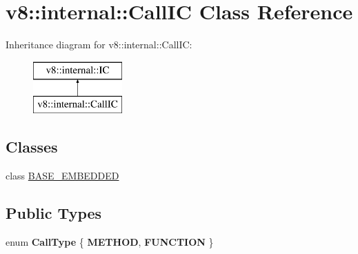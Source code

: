\hypertarget{classv8_1_1internal_1_1_call_i_c}{}\section{v8\+:\+:internal\+:\+:Call\+I\+C Class Reference}
\label{classv8_1_1internal_1_1_call_i_c}
Inheritance diagram for v8\+:\+:internal\+:\+:Call\+I\+C\+:\begin{figure}[H]
\begin{center}
\leavevmode
\includegraphics[height=2.000000cm]{classv8_1_1internal_1_1_call_i_c}
\end{center}
\end{figure}
\subsection*{Classes}
\begin{DoxyCompactItemize}
\item 
class \hyperlink{classv8_1_1internal_1_1_call_i_c_1_1_b_a_s_e___e_m_b_e_d_d_e_d}{B\+A\+S\+E\+\_\+\+E\+M\+B\+E\+D\+D\+E\+D}
\end{DoxyCompactItemize}
\subsection*{Public Types}
\begin{DoxyCompactItemize}
\item 
\hypertarget{classv8_1_1internal_1_1_call_i_c_a2479b33e456da6239fe91f8e5d017fde}{}enum {\bfseries Call\+Type} \{ {\bfseries M\+E\+T\+H\+O\+D}, 
{\bfseries F\+U\+N\+C\+T\+I\+O\+N}
 \}\label{classv8_1_1internal_1_1_call_i_c_a2479b33e456da6239fe91f8e5d017fde}

\end{DoxyCompactItemize}

